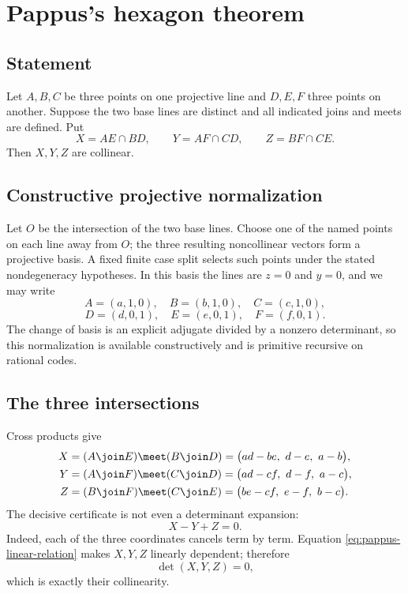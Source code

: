 \section{Pappus's hexagon theorem}

\subsection{Statement}

Let $A,B,C$ be three points on one projective line and $D,E,F$ three points on
another.  Suppose the two base lines are distinct and all indicated joins and
meets are defined.  Put
\[
 X=AE\cap BD,
 \qquad Y=AF\cap CD,
 \qquad Z=BF\cap CE.
\]
Then $X,Y,Z$ are collinear.

\subsection{Constructive projective normalization}

Let $O$ be the intersection of the two base lines.  Choose one of the named
points on each line away from $O$; the three resulting noncollinear vectors
form a projective basis.  A fixed finite case split selects such points under
the stated nondegeneracy hypotheses.  In this basis the lines are $z=0$ and
$y=0$, and we may write
\[
 A=(a,1,0),\quad B=(b,1,0),\quad C=(c,1,0),
\]
\[
 D=(d,0,1),\quad E=(e,0,1),\quad F=(f,0,1).
\]
The change of basis is an explicit adjugate divided by a nonzero determinant,
so this normalization is available constructively and is primitive recursive
on rational codes.

\subsection{The three intersections}

Cross products give
\begin{align*}
 X&=(A\join E)\meet(B\join D)
   =\bigl(ad-be,\ d-e,\ a-b\bigr),\\
 Y&=(A\join F)\meet(C\join D)
   =\bigl(ad-cf,\ d-f,\ a-c\bigr),\\
 Z&=(B\join F)\meet(C\join E)
   =\bigl(be-cf,\ e-f,\ b-c\bigr).
\end{align*}
The decisive certificate is not even a determinant expansion:
\begin{equation}\label{eq:pappus-linear-relation}
 X-Y+Z=0.
\end{equation}
Indeed, each of the three coordinates cancels term by term.  Equation
\eqref{eq:pappus-linear-relation} makes $X,Y,Z$ linearly dependent; therefore
\[
 \det(X,Y,Z)=0,
\]
which is exactly their collinearity.

